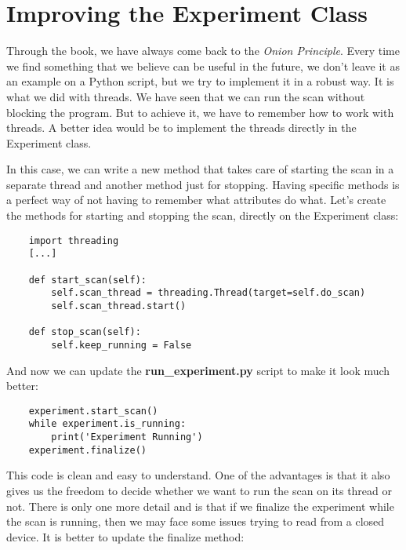 
\section{Improving the Experiment Class}\label{section:improving-experiment}
Through the book, we have always come back to the \emph{Onion Principle}. Every time we find something that we believe can be useful in the future, we don't leave it as an example on a Python script, but we try to implement it in a robust way. It is what we did with threads. We have seen that we can run the scan without blocking the program. But to achieve it, we have to remember how to work with threads. A better idea would be to implement the threads directly in the Experiment class.

In this case, we can write a new method that takes care of starting the scan in a separate thread and another method just for stopping. Having specific methods is a perfect way of not having to remember what attributes do what. Let's create the methods for starting and stopping the scan, directly on the Experiment class:

\begin{verbatim}
    import threading
    [...]

    def start_scan(self):
        self.scan_thread = threading.Thread(target=self.do_scan)
        self.scan_thread.start()

    def stop_scan(self):
        self.keep_running = False
\end{verbatim}

And now we can update the \textbf{run\_experiment.py} script to make it look much better:

\begin{verbatim}
    experiment.start_scan()
    while experiment.is_running:
        print('Experiment Running')
    experiment.finalize()
\end{verbatim}

This code is clean and easy to understand. One of the advantages is that it also gives us the freedom to decide whether we want to run the scan on its thread or not. There is only one more detail and is that if we finalize the experiment while the scan is running, then we may face some issues trying to read from a closed device. It is better to update the finalize method:

